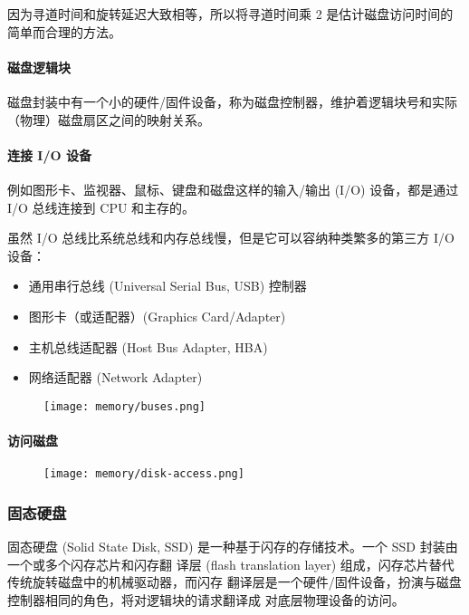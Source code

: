 因为寻道时间和旋转延迟大致相等，所以将寻道时间乘 2 是估计磁盘访问时间的简单而合理的方法。

\paragraph{磁盘逻辑块}

磁盘封装中有一个小的硬件/固件设备，称为磁盘控制器，维护着逻辑块号和实际（物理）磁盘扇区之间的映射关系。

\paragraph{连接 I/O 设备}

例如图形卡、监视器、鼠标、键盘和磁盘这样的输入/输出 (I/O) 设备，都是通过 I/O
总线连接到
CPU 和主存的。

虽然 I/O 总线比系统总线和内存总线慢，但是它可以容纳种类繁多的第三方 I/O 设备：
\begin{itemize}
    \item 通用串行总线 (Universal Serial Bus, USB) 控制器
    \item 图形卡（或适配器）(Graphics Card/Adapter)
    \item 主机总线适配器 (Host Bus Adapter, HBA)
    \item 网络适配器 (Network Adapter)
\end{itemize}

\begin{figure}[H]
    \centering
    \texttt{[image: memory/buses.png]}
\end{figure}

\paragraph{访问磁盘}

\begin{figure}[H]
    \centering
    \texttt{[image: memory/disk-access.png]}
\end{figure}

\subsubsection{固态硬盘}

固态硬盘 (Solid State Disk, SSD) 是一种基于闪存的存储技术。一个 SSD 封装由一个或多个闪存芯片和闪存翻
译层 (flash translation layer) 组成，闪存芯片替代传统旋转磁盘中的机械驱动器，而闪存
翻译层是一个硬件/固件设备，扮演与磁盘控制器相同的角色，将对逻辑块的请求翻译成
对底层物理设备的访问。

